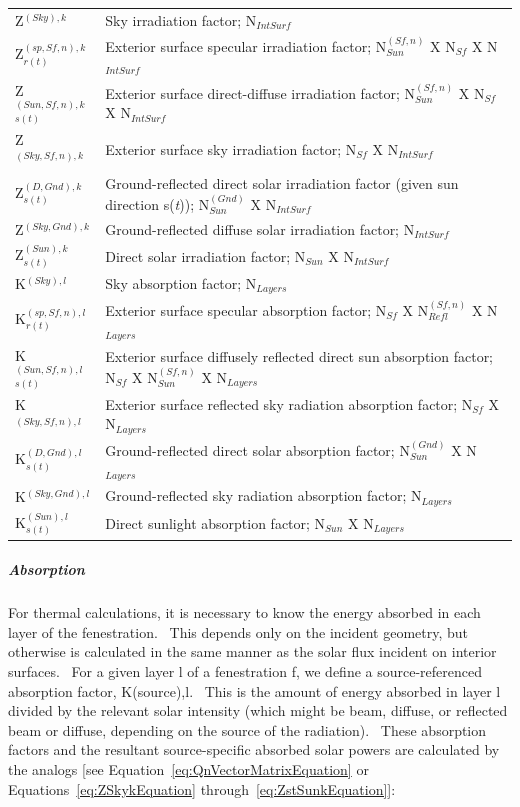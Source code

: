 \begin{longtable}[c]{p{1.5in}p{4.5in}}
Z\(^{(Sky), k}\) & Sky irradiation factor; N\(_{IntSurf}\) \tabularnewline
Z\(^{(sp,Sf,n),k}_{r(t)}\) & Exterior surface specular irradiation factor; N\(^{(Sf,n)}_{Sun}\) X N\(_{Sf}\) X N\(_{IntSurf}\) \tabularnewline
Z\(^{(Sun,Sf,n),k}_{s(t)}\) & Exterior surface direct-diffuse irradiation factor; N\(^{(Sf,n)}_{Sun}\) X N\(_{Sf}\) X N\(_{IntSurf}\) \tabularnewline
Z\(^{(Sky,Sf,n),k}\) & Exterior surface sky irradiation factor; N\(_{Sf}\) X N\(_{IntSurf}\) \tabularnewline
Z\(^{(D,Gnd),k}_{s(t)}\) & Ground-reflected direct solar irradiation factor (given sun direction s(\emph{t})); N\(^{(Gnd)}_{Sun}\) X N\(_{IntSurf}\) \tabularnewline
Z\(^{(Sky,Gnd),k}\) & Ground-reflected diffuse solar irradiation factor; N\(_{IntSurf}\) \tabularnewline
Z\(^{(Sun),k}_{s(t)}\) & Direct solar irradiation factor; N\(_{Sun}\) X N\(_{IntSurf}\) \tabularnewline
K\(^{(Sky),l}\) & Sky absorption factor; N\(_{Layers}\) \tabularnewline
K\(^{(sp,Sf,n),l}_{r(t)}\) & Exterior surface specular absorption factor; N\(_{Sf}\) X N\(^{(Sf,n)}_{Refl}\) X N\(_{Layers}\) \tabularnewline
K\(^{(Sun,Sf,n),l}_{s(t)}\) & Exterior surface diffusely reflected direct sun absorption factor; N\(_{Sf}\) X N\(^{(Sf,n)}_{Sun}\) X N\(_{Layers}\) \tabularnewline
K\(^{(Sky,Sf,n),l}\) & Exterior surface reflected sky radiation absorption factor; N\(_{Sf}\) X N\(_{Layers}\) \tabularnewline
K\(^{(D,Gnd),l}_{s(t)}\) & Ground-reflected direct solar absorption factor; N\(^{(Gnd)}_{Sun}\) X N\(_{Layers}\) \tabularnewline
K\(^{(Sky,Gnd),l}\) & Ground-reflected sky radiation absorption factor; N\(_{Layers}\) \tabularnewline
K\(^{(Sun),l}_{s(t)}\) & Direct sunlight absorption factor; N\(_{Sun}\) X N\(_{Layers}\) \tabularnewline
\bottomrule
\end{longtable}

\subparagraph{Absorption}\label{absorption}

For thermal calculations, it is necessary to know the energy absorbed in each layer of the fenestration.~ This depends only on the incident geometry, but otherwise is calculated in the same manner as the solar flux incident on interior surfaces. ~For a given layer l of a fenestration f, we define a source-referenced absorption factor, K(source),l.~ This is the amount of energy absorbed in layer l divided by the relevant solar intensity (which might be beam, diffuse, or reflected beam or diffuse, depending on the source of the radiation).~ These absorption factors and the resultant source-specific absorbed solar powers are calculated by the analogs {[}see Equation~\ref{eq:QnVectorMatrixEquation} or Equations~\ref{eq:ZSkykEquation} through~\ref{eq:ZstSunkEquation}{]}:

